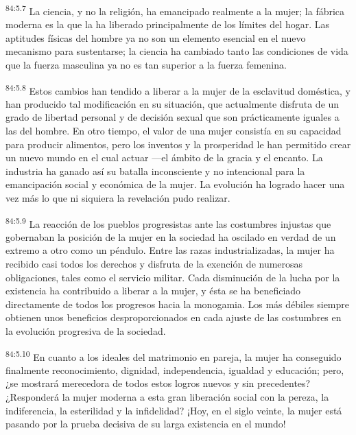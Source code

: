 \par
\textsuperscript{84:5.7} La ciencia, y no la religión, ha emancipado realmente a la mujer; la fábrica moderna es la que la ha liberado principalmente de los límites del hogar. Las aptitudes físicas del hombre ya no son un elemento esencial en el nuevo mecanismo para sustentarse; la ciencia ha cambiado tanto las condiciones de vida que la fuerza masculina ya no es tan superior a la fuerza femenina.

\par
\textsuperscript{84:5.8} Estos cambios han tendido a liberar a la mujer de la esclavitud doméstica, y han producido tal modificación en su situación, que actualmente disfruta de un grado de libertad personal y de decisión sexual que son prácticamente iguales a las del hombre. En otro tiempo, el valor de una mujer consistía en su capacidad para producir alimentos, pero los inventos y la prosperidad le han permitido crear un nuevo mundo en el cual actuar ---el ámbito de la gracia y el encanto. La industria ha ganado así su batalla inconsciente y no intencional para la emancipación social y económica de la mujer. La evolución ha logrado hacer una vez más lo que ni siquiera la revelación pudo realizar.

\par
\textsuperscript{84:5.9} La reacción de los pueblos progresistas ante las costumbres injustas que gobernaban la posición de la mujer en la sociedad ha oscilado en verdad de un extremo a otro como un péndulo. Entre las razas industrializadas, la mujer ha recibido casi todos los derechos y disfruta de la exención de numerosas obligaciones, tales como el servicio militar. Cada disminución de la lucha por la existencia ha contribuido a liberar a la mujer, y ésta se ha beneficiado directamente de todos los progresos hacia la monogamia. Los más débiles siempre obtienen unos beneficios desproporcionados en cada ajuste de las costumbres en la evolución progresiva de la sociedad.

\par
\textsuperscript{84:5.10} En cuanto a los ideales del matrimonio en pareja, la mujer ha conseguido finalmente reconocimiento, dignidad, independencia, igualdad y educación; pero, ¿se mostrará merecedora de todos estos logros nuevos y sin precedentes? ¿Responderá la mujer moderna a esta gran liberación social con la pereza, la indiferencia, la esterilidad y la infidelidad? ¡Hoy, en el siglo veinte, la mujer está pasando por la prueba decisiva de su larga existencia en el mundo!

